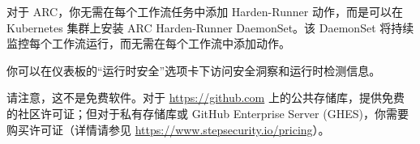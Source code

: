 对于 ARC，你无需在每个工作流任务中添加 Harden-Runner 动作，而是可以在 Kubernetes 集群上安装 ARC Harden-Runner DaemonSet。该 DaemonSet 将持续监控每个工作流运行，而无需在每个工作流中添加动作。

你可以在仪表板的“运行时安全”选项卡下访问安全洞察和运行时检测信息。

请注意，这不是免费软件。对于 \url{https://github.com} 上的公共存储库，提供免费的社区许可证；但对于私有存储库或 GitHub Enterprise Server (GHES)，你需要购买许可证（详情请参见 \url{https://www.stepsecurity.io/pricing}）。



